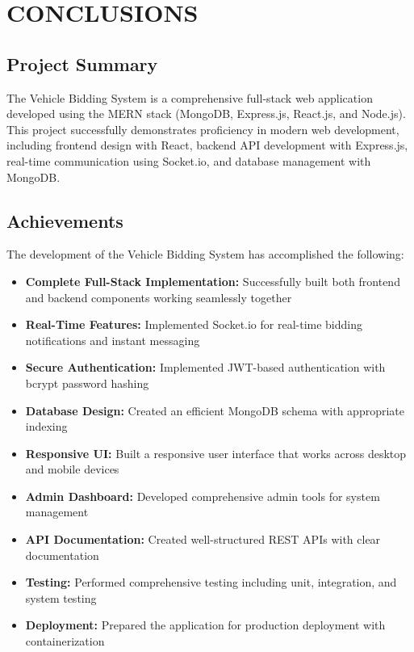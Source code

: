 \chapter{CONCLUSIONS}

\section{Project Summary}

The Vehicle Bidding System is a comprehensive full-stack web application developed using the MERN stack (MongoDB, Express.js, React.js, and Node.js). This project successfully demonstrates proficiency in modern web development, including frontend design with React, backend API development with Express.js, real-time communication using Socket.io, and database management with MongoDB.

\section{Achievements}

The development of the Vehicle Bidding System has accomplished the following:

\begin{itemize}
    \item \textbf{Complete Full-Stack Implementation:} Successfully built both frontend and backend components working seamlessly together
    \item \textbf{Real-Time Features:} Implemented Socket.io for real-time bidding notifications and instant messaging
    \item \textbf{Secure Authentication:} Implemented JWT-based authentication with bcrypt password hashing
    \item \textbf{Database Design:} Created an efficient MongoDB schema with appropriate indexing
    \item \textbf{Responsive UI:} Built a responsive user interface that works across desktop and mobile devices
    \item \textbf{Admin Dashboard:} Developed comprehensive admin tools for system management
    \item \textbf{API Documentation:} Created well-structured REST APIs with clear documentation
    \item \textbf{Testing:} Performed comprehensive testing including unit, integration, and system testing
    \item \textbf{Deployment:} Prepared the application for production deployment with containerization
\end{itemize}

